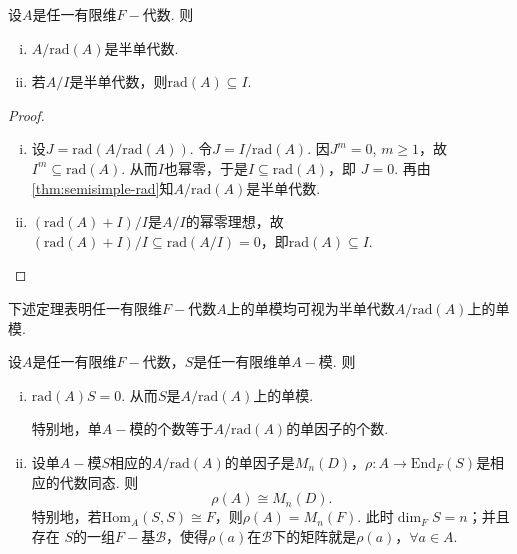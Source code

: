 \begin{corollary}
    设$A$是任一有限维$F-\!\!$代数. 则
    \begin{enumerate}[(i)]
        \item $A/\mathrm{rad}(A)$是半单代数.
        \item 若$A/I$是半单代数，则$\mathrm{rad}(A) \subseteq I$.
    \end{enumerate}
\end{corollary}

\begin{proof}
    \begin{enumerate}[(i)]
        \item 设$J = \mathrm{rad}(A/\mathrm{rad}(A))$. 令$J = I/\mathrm{rad}(A)$. 因$J^m = 0$, $m \geq
        1$，故$I^m \subseteq \mathrm{rad}(A)$. 从而$I$也幂零，于是$I \subseteq \mathrm{rad}(A)$，即
        $J = 0$. 再由\cref{thm:semisimple-rad}知$A/\mathrm{rad}(A)$是半单代数.
        \item $(\mathrm{rad}(A) + I)/I$是$A/I$的幂零理想，故$(\mathrm{rad}(A) + I)/I \subseteq
        \mathrm{rad}(A/I) = 0$，即$\mathrm{rad}(A) \subseteq I$. \qedhere
    \end{enumerate}
\end{proof}

下述定理表明任一有限维$F-\!\!$代数$A$上的单模均可视为半单代数$A/\mathrm{rad}(A)$上的单模.

\begin{theorem}
    设$A$是任一有限维$F-\!\!$代数，$S$是任一有限维单$A-\!\!$模. 则
    \begin{enumerate}[(i)]
        \item $\mathrm{rad}(A)S = 0$. 从而$S$是$A/\mathrm{rad}(A)$上的单模.\par
        特别地，单$A-\!\!$模的个数等于$A/\mathrm{rad}(A)$的单因子的个数.
        \item 设单$A-\!\!$模$S$相应的$A/\mathrm{rad}(A)$的单因子是$M_n(D)$，$\rho: A \longrightarrow
        \mathrm{End}_F(S)$是相应的代数同态. 则
        \[ \rho(A) \cong M_n(D). \]
        特别地，若$\mathrm{Hom}_A(S, S) \cong F$，则$\rho(A) = M_n(F)$. 此时$\dim_F S = n$；并且存在
        $S$的一组$F-\!\!$基$\mathcal{B}$，使得$\rho(a)$在$\mathcal{B}$下的矩阵就是$\rho(a)$，$\forall
        a \in A$.
    \end{enumerate}
\end{theorem}

